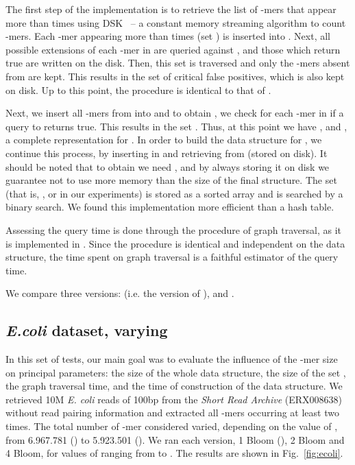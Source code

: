 \documentclass[pdftex]{llncs}\usepackage[T1]{fontenc}
\begin{document}
The first step of the implementation is to retrieve the list of -mers
that appear more than  times using
DSK~\cite{dsk} -- a constant memory streaming algorithm to count
-mers.
Each -mer appearing
more than  times (set ) is inserted into . Next, all possible extensions of each
-mer in  are queried against , and those which return
true are written on the disk. 
Then, this set is traversed and only the -mers absent from  are
kept. This results in the set  of critical false positives, which is also kept on
disk. Up to this point, the procedure is identical to that of
\cite{DBLP:conf/wabi/ChikhiR12}. 

Next, we insert all -mers from  into  and to
obtain , we check for each -mer in  if a query to 
returns true. This results in the set . Thus, 
at this point we have ,  and , a complete
representation for . In order to build the data structure for , we continue this
process, by inserting  in  and retrieving  from 
(stored on disk). It should be noted that to obtain 
we need , and by always storing it on disk we guarantee
not to use more memory than the size of the final structure. 
The set  (that is, ,  or  in our experiments)
is stored as a sorted array and is searched by a binary search. We
found this implementation more efficient than a hash table. 

Assessing the query time is done through the procedure of graph
traversal, as it is implemented in
\cite{DBLP:conf/wabi/ChikhiR12}. Since the procedure is identical and
independent on the data structure, the time spent on graph traversal
is a faithful estimator of the query time. 

We compare three versions:  (i.e. the version of
\cite{DBLP:conf/wabi/ChikhiR12}),  and . 

\subsection{\emph{E.coli} dataset, varying }
In this set of tests, our main goal was to evaluate the influence of
the -mer size on principal parameters:  the size of
the whole data structure, the size of the set , the graph
traversal time, and the time of construction of the data structure. 
We retrieved 10M \emph{E. coli} reads of 100bp
from the \emph{Short Read Archive} (ERX008638) without read pairing
information and 
extracted all -mers occurring at least two times. The total number
of -mer considered varied, depending on the value of , from
6.967.781 () to 5.923.501 ().  We ran each version, 1
Bloom (\cite{DBLP:conf/wabi/ChikhiR12}), 2 Bloom and 4 Bloom, for
values of  ranging from  to . The results are shown in
Fig.~\ref{fig:ecoli}.
\end{document}
